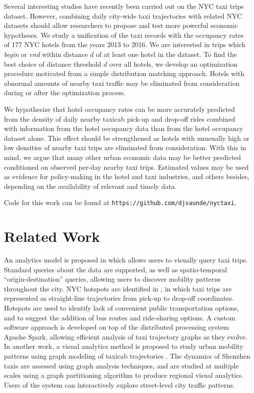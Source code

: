 \documentclass[useAMS, usenatbib]{biom}
\begin{document}
Several interesting studies have recently been carried out on the NYC taxi trips dataset. However, combining daily city-wide taxi trajectories with related NYC datasets should allow researchers to propose and test more powerful economic hypotheses. We study a unification of the taxi records with the occupancy rates of 177 NYC hotels from the years 2013 to 2016. We are interested in trips which \textit{begin} or \textit{end} within distance $d$ of at least one hotel in the dataset. To find the best choice of distance threshold $d$ over all hotels, we develop an optimization procedure motivated from a simple distribution matching approach. Hotels with abnormal amounts of nearby taxi traffic may be eliminated from consideration during or after the optimization process.

We hypothesize that hotel occupancy rates can be more accurately predicted from the density of daily nearby taxicab pick-up and drop-off rides combined with information from the hotel occupancy data than from the hotel occupancy dataset alone. This effect should be strengthened as hotels with unusually high or low densities of nearby taxi trips are eliminated from consideration. With this in mind, we argue that many other urban economic data may be better predicted conditioned on observed per-day nearby taxi trips. Estimated values may be used as evidence for policy-making in the hotel and taxi industries, and others besides, depending on the availability of relevant and timely data.

Code for this work can be found at \texttt{https://github.com/djsaunde/nyctaxi}.

\section{Related Work}
\label{s:related}

An analytics model is proposed in \citet{Ferreira2013VisualEO} which allows users to visually query taxi trips. Standard queries about the data are supported, as well as spatio-temporal ``origin-destination'' queries, allowing users to discover mobility patterns throughout the city. NYC hotspots are identified in \citet{Stoyanovich2017ZoomingIO}, in which taxi trips are represented as straight-line trajectories from pick-up to drop-off coordinates. Hotspots are used to identify lack of convenient public transportation options, and to suggest the addition of bus routes and ride-sharing options. A custom software approach is developed on top of the distributed processing system Apache Spark, allowing efficient analysis of taxi trajectory graphs as they evolve. In another work, a visual analytics method is proposed to study urban mobility patterns using graph modeling of taxicab trajectories \citep{Huang2016TrajGraphAG}. The dynamics of Shenzhen taxis are assessed using graph analysis techniques, and are studied at multiple scales using a graph partitioning algorithm to produce regional visual analytics. Users of the system can interactively explore street-level city traffic patterns. 
\end{document}
